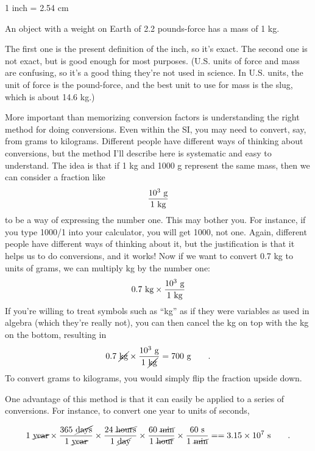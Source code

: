 \begin{indentedblock}
\noindent{}1 inch =  2.54 cm

\noindent An object with a weight on Earth of 2.2 pounds-force has a mass of 1 kg.
\end{indentedblock}

\noindent The first one is the present definition of the inch, so it's
exact. The second one is not exact, but is good enough for
most purposes. (U.S. units of force and mass are confusing,
so it's a good thing they're not used in science. In U.S.
units, the unit of force is the pound-force, and the best
unit to use for mass is the slug, which is about 14.6 kg.)

More important than memorizing conversion factors is
understanding the right method for doing conversions. Even
within the SI, you may need to convert, say, from grams to
kilograms. Different people have different ways of thinking
about conversions, but the method I'll describe here is
systematic and easy to understand. The idea is that if 1 kg
and 1000 g represent the same mass, then we can consider a fraction like
\begin{equation*}
  \frac{10^3\ \gunit}{1\ \kgunit}
\end{equation*}
to be a way of expressing the number one. This may bother
you. For instance, if you type 1000/1 into your calculator,
you will get 1000, not one. Again, different people have
different ways of thinking about it, but the justification
is that it helps us to do conversions, and it works! Now if
we want to convert 0.7 kg to units of grams, we can multiply
kg by the number one:
\begin{equation*}
  0.7\ \kgunit \times \frac{10^3\ \gunit}{1\ \kgunit}
\end{equation*}
If you're willing to treat symbols such as ``kg'' as if they
were variables as used in algebra (which they're really
not), you can then cancel the kg on top with the kg on the
bottom, resulting in
\begin{equation*}
  0.7\ \cancel{\kgunit} \times \frac{10^3\ \gunit}{1\ \cancel{\kgunit}}  = 700\ \gunit   \qquad   .
\end{equation*}
To convert grams to kilograms, you would simply flip the
fraction upside down.

One advantage of this method is that it can easily be
applied to a series of conversions. For instance, to convert
one year to units of seconds,

\begin{multline*}
1\ \cancel{\text{year}} \times
\frac{365\ \cancel{\text{days}}}{1\ \cancel{\text{year}}} \times
\frac{24\ \cancel{\text{hours}}}{1\ \cancel{\text{day}}} \times
\frac{60\ \cancel{\text{min}}}{1\ \cancel{\text{hour}}} \times
\frac{60\ \textup{s}}{1\ \cancel{\text{min}}} = 
= 3.15 \times 10^7\ \textup{s}   \qquad   .
\end{multline*}

